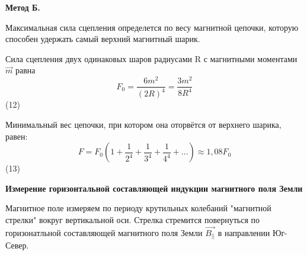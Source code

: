 \documentclass[a4paper,12pt]{article}
\begin{document}

\textbf{Метод Б.}

Максимальная сила сцепления определется по весу магнитной цепочки, которую способен удержать самый верхний магнитный шарик.


Сила сцепления двух одинаковых шаров радиусами R с магнитными моментами $\vec{m}$ равна $$ F_0 = \frac{6m^2}{{(2R)}^4} = \frac{3m^2}{8R^4} $$ (12)

Минимальный вес цепочки, при котором она оторвётся от верхнего шарика, равен: $$ F = F_0(1 + \frac{1}{2^4} + \frac{1}{3^4} + \frac{1}{4^4} + ...) \approx 1,08F_0 $$ (13)

\textbf{Измерение горизонтальной составляющей индукции магнитного поля Земли}

Магнитное поле измеряем по периоду крутильных колебаний "магнитной стрелки" вокруг вертикальной оси. Стрелка стремится повернуться по горизонатльной составляющей магнитного поля Земли $\vec{B_{||}}$ в направлении Юг-Север. 
\end{document}
